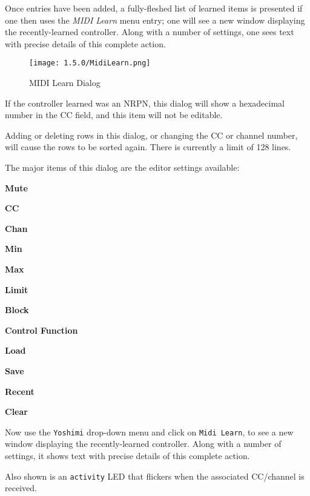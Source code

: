    Once entries have been added, a fully-fleshed list of learned items is
   presented if one then uses the \textsl{MIDI Learn} menu entry; one will
   see a new window displaying the recently-learned controller. Along with a
   number of settings, one sees text with precise details of this complete
   action.

\begin{figure}[H]
   \centering 
   \texttt{[image: 1.5.0/MidiLearn.png]}
   \caption{MIDI Learn Dialog}
   \label{fig:midi_learn_dialog}
\end{figure}

   If the controller learned was an NRPN, this dialog will show a hexadecimal
   number in the CC field, and this item will not be editable.

   Adding or deleting rows in this dialog, or changing the CC or channel
   number, will cause the rows to be sorted again.
   There is currently a limit of 128 lines.

   The major items of this dialog are the editor settings available:

   \begin{enumber}
      \item \textbf{Mute}
      \item \textbf{CC}
      \item \textbf{Chan}
      \item \textbf{Min}
      \item \textbf{Max}
      \item \textbf{Limit}
      \item \textbf{Block}
      \item \textbf{Control Function}
      \item \textbf{Load}
      \item \textbf{Save}
      \item \textbf{Recent}
      \item \textbf{Clear}
   \end{enumber}

   Now use the \texttt{Yoshimi} drop-down menu
   and click on \texttt{Midi Learn}, to see a new window displaying the
   recently-learned controller. Along with a number of settings, it shows text
   with precise details of this complete
   action.

   Also shown is an \texttt{activity} LED that flickers when the associated
   CC/channel is received.

   \setcounter{ItemCounter}{0}      %

